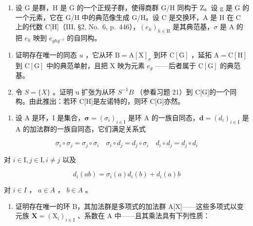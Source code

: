 \begin{enumerate}
\def\labelenumi{\arabic{enumi})}
\setcounter{enumi}{21}
\tightlist
\item
  设 G 是群，H 是 G 的一个正规子群，使得商群 G/H 同构于 Z。设 g 是 G 的一个元素，它在 G/H 中的典范像生成 G/H。设 C 是交换环，A 是 H 在 C 上的代数 C{[}H{]}（III, §2, No.~6, p.~446），\((e_{h})_{h\in\mathrm{H}}\) 是其典范基，\(\sigma\) 是 A 的把 \(e_{h}\) 映到 \(e_{ghg^{-1}}\) 的自同构。
\end{enumerate}

\begin{enumerate}
\def\labelenumi{\alph{enumi})}
\item
  证明存在唯一的同态 \(u\) ，它从环 \(\mathrm{B} = \mathrm{A}[\mathrm{X}]_{\sigma}\) 到环 \(\mathrm{C}[\mathrm{G}]\) ，延拓 \(\mathrm{A} = \mathrm{C}[\mathrm{H}]\) 到 \(\mathrm{C}[\mathrm{G}]\) 中的典范单射，且把 \(\mathrm{X}\) 映为元素 \(e_g\) ——后者属于 \(\mathrm{C}[\mathrm{G}]\) 的典范基。
\item
  令 \(S = \{X\}\) 。证明 u 扩张为从环 \(S^{-1}B\) （参看习题 21）到 C{[}G{]}的一个同构。由此推出：若环 C{[}H{]}是左诺特的，则环 C{[}G{]}亦然。
\end{enumerate}

\begin{enumerate}
\def\labelenumi{\arabic{enumi})}
\setcounter{enumi}{22}
\tightlist
\item
  设 A 是环，I 是集合，\(\symbf{\sigma} = (\sigma_{i})_{i \in \mathrm{I}}\) 是环 A 的一族自同态，\(\symbf{d} = (d_{i})_{i \in \mathrm{I}}\) 是 A 的加法群的一族自同态，它们满足关系式
\end{enumerate}

\[
\sigma_ {i} \circ \sigma_ {j} = \sigma_ {j} \circ \sigma_ {i} \quad \sigma_ {i} \circ d _ {j} = d _ {j} \circ \sigma_ {i} \quad d _ {i} \circ d _ {j} = d _ {j} \circ d _ {i}
\]

对 \(i\in \mathrm{I},j\in \mathrm{I},i\neq j\) 以及

\[
d _ {i} (a b) = \sigma_ {i} (a) d _ {i} (b) + d _ {i} (a) b
\]

对 \(i \in I\) ， \(a \in A\) ， \(b \in A\) 。

\begin{enumerate}
\def\labelenumi{\alph{enumi})}
\tightlist
\item
  证明存在唯一的环 B，其加法群是多项式的加法群 A{[}X{]}——这些多项式以变元族 \(\mathbf{X} = (\mathrm{X}_{i})_{i \in \mathrm{I}}\) 、系数在 A 中——且其乘法具有下列性质：
\end{enumerate}

